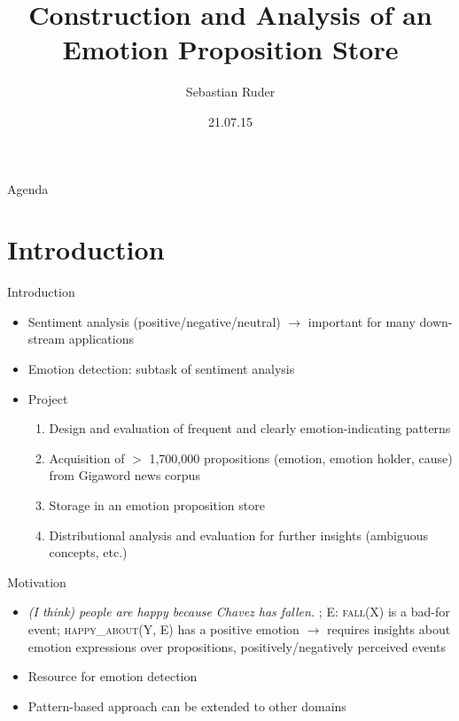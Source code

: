 \documentclass[11pt]{beamer}
\author{Sebastian Ruder}
\title{Construction and Analysis of an Emotion Proposition Store}
\institute{Institute of Computational Linguistics, University of Heidelberg}
\date{21.07.15}
\begin{document}
\begin{frame}
\titlepage
\end{frame}

\begin{frame}{Agenda}
\tableofcontents
\end{frame}

\section{Introduction}

\begin{frame}{Introduction}

\begin{itemize}
	\item Sentiment analysis (positive/negative/neutral) $\rightarrow $ important for many down-stream applications
	\item Emotion detection: subtask of sentiment analysis
	\item Project
	\begin{enumerate}
		\item Design and evaluation of frequent and clearly emotion-indicating patterns
		\item Acquisition of $>$ 1,700,000 propositions (emotion, emotion holder, cause) from Gigaword news corpus \cite{gigaword}
		\item Storage in an emotion proposition store
		\item Distributional analysis and evaluation for further insights (ambiguous concepts, etc.)
	\end{enumerate}
\end{itemize}

\end{frame}

\begin{frame}{Motivation}
	\begin{itemize}
		\item \textit{(I think) people are happy because Chavez has fallen.} \cite{benefactive_malefactive}; \textsc{E: fall(X)} is a bad-for event; \textsc{happy\_about(Y, E)} has a positive emotion $\rightarrow$ requires insights about emotion expressions over propositions, positively/negatively perceived events
		\item Resource for emotion detection
		\item Pattern-based approach can be extended to other domains
	\end{itemize}
\end{frame}
\end{document}
